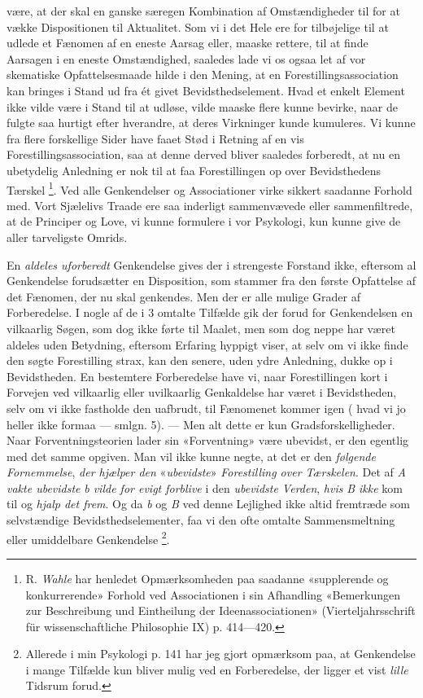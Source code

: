 \documentclass[12pt,a4paper,openany]{book}
\newcommand{\opage}[1]{\marginnote{\footnotesize\textit{[#1]}}}
\begin{document}
være, at der skal en ganske særegen Kombination af Omstændigheder til for at
vække Dispositionen til Aktualitet. Som vi i det Hele ere for tilbøjelige til
at udlede et Fænomen af en eneste Aarsag eller, maaske rettere, til at finde
Aarsagen i en eneste Omstændighed, saaledes lade vi os ogsaa let af vor
skematiske Opfattelsesmaade hilde i den Mening, at en Forestillingsassociation
kan bringes i Stand ud fra ét givet Bevidsthedselement. Hvad et enkelt Element
ikke vilde være i Stand til at udløse, vilde maaske flere kunne bevirke, naar
de fulgte saa hurtigt efter hverandre, at deres Virkninger kunde kumuleres. Vi
kunne fra flere forskellige Sider have faaet Stød i Retning af en vis
Forestillingsassociation, saa at denne derved bliver saaledes forberedt, at nu
en ubetydelig Anledning er nok til at faa Forestillingen op over Bevidsthedens
Tærskel%
\footnote[2]{R. \emph{Wahle} har henledet Opmærksomheden paa saadanne
«supplerende og konkurrerende» Forhold ved Associationen i sin Afhandling
«Bemerkungen zur Beschreibung und Eintheilung der Ideenassociationen»
(Vierteljahrsschrift für wissenschaftliche Philosophie IX) p. 414---420.}. Ved
alle Genkendelser og Associationer virke sikkert saadanne Forhold med. Vort
Sjælelivs Traade ere saa inderligt sammenvævede eller sammenfiltrede, at de
Principer og Love, vi kunne formulere i vor Psykologi, kun kunne give de aller
tarveligste Omrids.

En \emph{aldeles uforberedt} Genkendelse gives der i strengeste Forstand ikke,
eftersom al Genkendelse forudsætter en Disposition, som stammer fra den første
Opfattelse af det Fænomen, der nu skal genkendes. Men der er alle mulige Grader
af Forberedelse. I nogle af de i 3 omtalte Tilfælde gik der forud for
Genkendelsen en vilkaarlig Søgen, som dog ikke førte til Maalet, men som dog
neppe har været aldeles uden Betydning, eftersom Erfaring hyppigt viser, at
selv om vi ikke finde den søgte Forestilling strax, kan den senere, uden ydre
Anledning, dukke op i Bevidstheden. En bestemtere Forberedelse have vi, naar
Forestillingen kort i Forvejen ved vilkaarlig eller uvilkaarlig Genkaldelse har
været i Bevidstheden, selv om vi ikke fastholde den uafbrudt, til Fænomenet
kommer igen (
\setcounter{footnote}{0}%
\opage{24}hvad vi jo heller ikke formaa --- smlgn. 5). --- Men alt dette er kun
Gradsforskelligheder. Naar Forventningsteorien lader sin «Forventning» være
ubevidst, er den egentlig med det samme opgiven. Man vil ikke kunne negte, at
det er den \emph{følgende Fornemmelse}, \emph{der hjælper den}
«\emph{ubevidste}» \emph{Forestilling over Tærskelen}. Det af \textit{A vakte
ubevidste} \textit{b vilde for evigt forblive} i den \emph{ubevidste Verden},
\emph{hvis} \textit{B ikke} kom til og \emph{hjalp det frem}. Og da \textit{b}
og \textit{B} ved denne Lejlighed ikke altid fremtræde som selvstændige
Bevidsthedselementer, faa vi den ofte omtalte Sammensmeltning eller umiddelbare
Genkendelse%
\footnote[1]{Allerede i min Psykologi p. 141 har jeg gjort opmærksom paa, at
Genkendelse i mange Tilfælde kun bliver mulig ved en Forberedelse, der ligger
et vist \emph{lille} Tidsrum forud.}.
\end{document}
